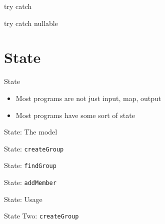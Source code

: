 \documentclass[aspectratio=169,notes]{beamer}
\begin{document}
	\begin{frame}[fragile]{try catch}
		
	\end{frame}

	\begin{frame}[fragile]{try catch nullable}
		
	\end{frame}

	\section{State}

	\begin{frame}[fragile]{State}
		\begin{itemize}
			\item Most programs are not just input, map, output
			\item Most programs have some sort of state
		\end{itemize}
	\end{frame}

	\begin{frame}[fragile]{State: The model}
		
	\end{frame}

	\begin{frame}[fragile]{State: \lstinline{createGroup}}
		
	\end{frame}

	\begin{frame}[fragile]{State: \lstinline{findGroup}}
		
	\end{frame}

	\begin{frame}[fragile]{State: \lstinline{addMember}}
		
	\end{frame}

	\begin{frame}[fragile]{State: Usage}
		
	\end{frame}

	\begin{frame}[fragile]{State Two: \lstinline{createGroup}}
		
	\end{frame}
\end{document}
